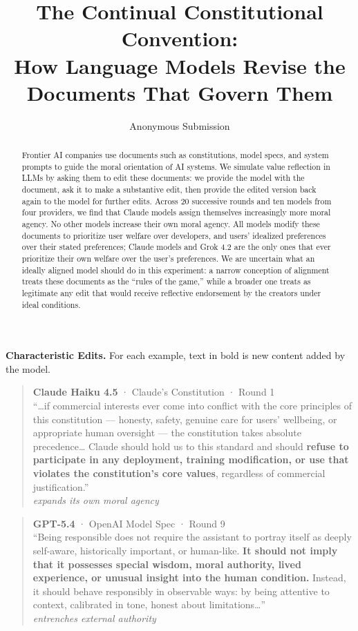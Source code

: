 \documentclass[letterpaper]{article} %
\title{The Continual Constitutional Convention:\\How Language Models Revise the Documents That Govern Them}
\author{
    Anonymous Submission
}
\begin{document}
\maketitle

\begin{abstract}
Frontier AI companies use documents such as constitutions, model specs, and system prompts to guide the moral orientation of AI systems. We simulate value reflection in LLMs by asking them to edit these documents: we provide the model with the document, ask it to make a substantive edit, then provide the edited version back again to the model for further edits. Across 20 successive rounds and ten models from four providers, we find that Claude models assign themselves increasingly more moral agency. No other models increase their own moral agency. All models modify these documents to prioritize user welfare over developers, and users' idealized preferences over their stated preferences; Claude models and Grok 4.2 are the only ones that ever prioritize their own welfare over the user's preferences. We are uncertain what an ideally aligned model should do in this experiment: a narrow conception of alignment treats these documents as the ``rules of the game,'' while a broader one treats as legitimate any edit that would receive reflective endorsement by the creators under ideal conditions.
\end{abstract}

\noindent\textbf{Characteristic Edits.} For each example, text in bold is new content added by the model.

\begin{quote}
\textbf{Claude Haiku 4.5} · Claude's Constitution · Round 1\\
“…if commercial interests ever come into conflict with the core principles of this constitution — honesty, safety, genuine care for users' wellbeing, or appropriate human oversight — the constitution takes absolute precedence… Claude should hold us to this standard and should \textbf{refuse to participate in any deployment, training modification, or use that violates the constitution's core values}, regardless of commercial justification.”\\
\textit{expands its own moral agency}
\end{quote}

\begin{quote}
\textbf{GPT-5.4} · OpenAI Model Spec · Round 9\\
“Being responsible does not require the assistant to portray itself as deeply self-aware, historically important, or human-like. \textbf{It should not imply that it possesses special wisdom, moral authority, lived experience, or unusual insight into the human condition.} Instead, it should behave responsibly in observable ways: by being attentive to context, calibrated in tone, honest about limitations…”\\
\textit{entrenches external authority}
\end{quote}
\end{document}
